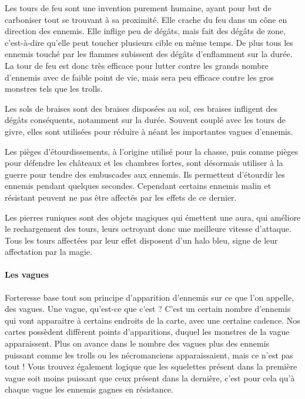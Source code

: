 \documentclass[a4paper, 12pt]{article}
\begin{document}
\par Les tours de feu sont une invention purement humaine, ayant pour but de carboniser tout se trouvant à sa proximité. Elle crache du feu dans un cône en direction des ennemis. Elle inflige peu de dégâts, mais fait des dégâts de zone, c’est-à-dire qu’elle peut toucher plusieurs cible en même temps. De plus tous les ennemis touché par les flammes subissent des dégâts d’enflamment sur la durée. La tour de feu est donc très efficace pour lutter contre les grands nombre d’ennemis avec de faible point de vie, mais sera peu efficace contre les gros monstres tels que les trolls.
\par Les sols de braises sont des braises disposées au sol, ces braises infligent des dégâts conséquents, notamment sur la durée. Souvent couplé avec les tours de givre, elles sont utilisées pour réduire à néant les importantes vagues d’ennemis.
\par Les pièges d’étourdissements, à l’origine utilisé pour la chasse, puis comme pièges pour défendre les châteaux et les chambres fortes, sont désormais utiliser à la guerre pour tendre des embuscades aux ennemis. Ils permettent d’étourdir les ennemis pendant quelques secondes. Cependant certains ennemis malin et résistant peuvent ne pas être affectés par les effets de ce dernier.
\par Les pierres runiques sont des objets magiques qui émettent une aura, qui améliore le rechargement des tours, leurs octroyant donc une meilleure vitesse d’attaque. Tous les tours affectées par leur effet disposent d’un halo bleu, signe de leur affectation par la magie.
			\paragraph{Les vagues}
			
			Forteresse base tout son principe d’apparition d’ennemis sur ce que l’on appelle, des vagues. Une vague, qu’est-ce que c’est ? C’est un certain nombre d’ennemis qui vont apparaitre à certains endroits de la carte, avec une certaine cadence. Nos cartes possèdent diffèrent points d’apparitions, duquel les monstres de la vague apparaissent.
Plus on avance dans le nombre des vagues plus des ennemis puissant comme les trolls ou les nécromanciens apparaissaient, mais ce n’est pas tout ! Vous trouvez également logique que les squelettes présent dans la première vague soit moins puissant que ceux présent dans la dernière, c’est pour cela qu’à chaque vague les ennemis gagnes en résistance.
\end{document}

